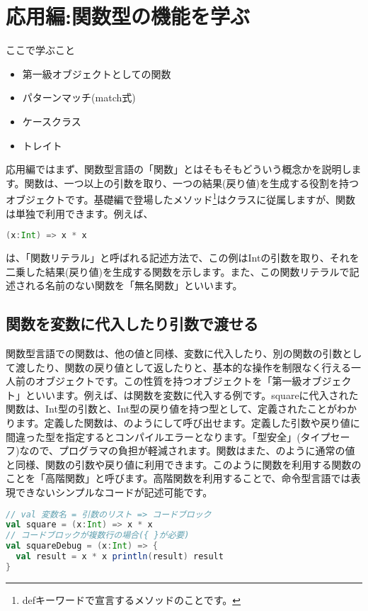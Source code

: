 \section{応用編:関数型の機能を学ぶ}
\begin{itembox}[l]{ここで学ぶこと}
\begin{itemize}
\item 第一級オブジェクトとしての関数
\item パターンマッチ(match式)
\item ケースクラス
\item トレイト
\end{itemize}
\end{itembox}

応用編ではまず、関数型言語の「関数」とはそもそもどういう概念かを説明します。関数は、一つ以上の引数を取り、一つの結果(戻り値)を生成する役割を持つオブジェクトです。基礎編で登場したメソッド\footnote{defキーワードで宣言するメソッドのことです。}はクラスに従属しますが、関数は単独で利用できます。例えば、
\begin{lstlisting}[language=scala, frame=none]
(x:Int) => x * x
\end{lstlisting}
は、「関数リテラル」と呼ばれる記述方法で、この例はIntの引数を取り、それを二乗した結果(戻り値)を生成する関数を示します。また、この関数リテラルで記述される名前のない関数を「無名関数」といいます。

\subsection{関数を変数に代入したり引数で渡せる}
関数型言語での関数は、他の値と同様、変数に代入したり、別の関数の引数として渡したり、関数の戻り値として返したりと、基本的な操作を制限なく行える一人前のオブジェクトです。この性質を持つオブジェクトを「第一級オブジェクト」といいます。例えば、は関数を変数に代入する例です。squareに代入された関数は、Int型の引数と、Int型の戻り値を持つ型として、定義されたことがわかります。定義した関数は、のようにして呼び出せます。定義した引数や戻り値に間違った型を指定するとコンパイルエラーとなります。「型安全」(タイプセーフ)なので、プログラマの負担が軽減されます。関数はまた、のように通常の値と同様、関数の引数や戻り値に利用できます。このように関数を利用する関数のことを「高階関数」と呼びます。高階関数を利用することで、命令型言語では表現できないシンプルなコードが記述可能です。

\begin{lstlisting}[language=scala, label=src:variable_function, caption=関数を変数に代入する例]
// val 変数名 = 引数のリスト => コードブロック
val square = (x:Int) => x * x
// コードブロックが複数行の場合({ }が必要)
val squareDebug = (x:Int) => {
  val result = x * x println(result) result
}
\end{lstlisting}


